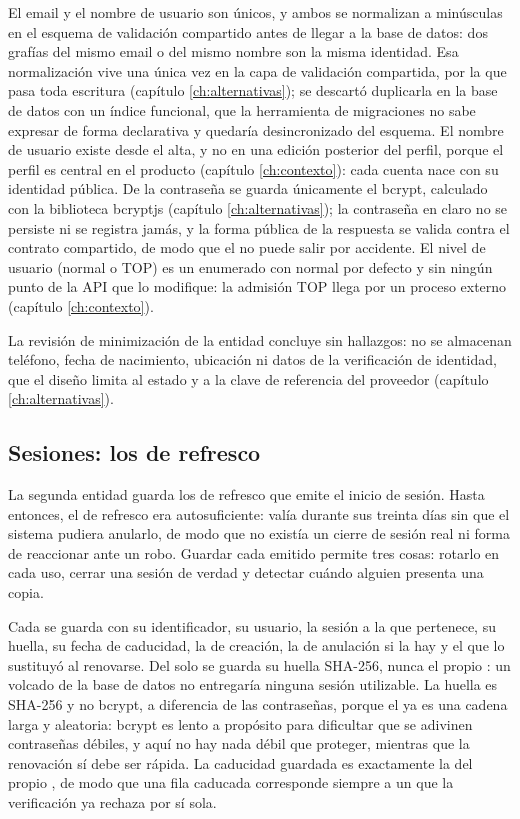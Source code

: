 El email y el nombre de usuario son únicos, y ambos se normalizan a minúsculas en el esquema de validación compartido antes de llegar a la base de datos: dos grafías del mismo email o del mismo nombre son la misma identidad.
Esa normalización vive una única vez en la capa de validación compartida, por la que pasa toda escritura (capítulo \ref{ch:alternativas}); se descartó duplicarla en la base de datos con un índice funcional, que la herramienta de migraciones no sabe expresar de forma declarativa y quedaría desincronizado del esquema.
El nombre de usuario existe desde el alta, y no en una edición posterior del perfil, porque el perfil es central en el producto (capítulo \ref{ch:contexto}): cada cuenta nace con su identidad pública.
De la contraseña se guarda únicamente el  bcrypt, calculado con la biblioteca bcryptjs (capítulo \ref{ch:alternativas}); la contraseña en claro no se persiste ni se registra jamás, y la forma pública de la respuesta se valida contra el contrato compartido, de modo que el  no puede salir por accidente.
El nivel de usuario (normal o TOP) es un enumerado con normal por defecto y sin ningún punto de la \ac{API} que lo modifique: la admisión TOP llega por un proceso externo (capítulo \ref{ch:contexto}).

La revisión de minimización de la entidad concluye sin hallazgos: no se almacenan teléfono, fecha de nacimiento, ubicación ni datos de la verificación de identidad, que el diseño limita al estado y a la clave de referencia del proveedor (capítulo \ref{ch:alternativas}).

\subsection{Sesiones: los  de refresco}
\label{sec:diseno-sesiones}

La segunda entidad guarda los  de refresco que emite el inicio de sesión.
Hasta entonces, el  de refresco era autosuficiente: valía durante sus treinta días sin que el sistema pudiera anularlo, de modo que no existía un cierre de sesión real ni forma de reaccionar ante un robo.
Guardar cada  emitido permite tres cosas: rotarlo en cada uso, cerrar una sesión de verdad y detectar cuándo alguien presenta una copia.

Cada  se guarda con su identificador, su usuario, la sesión a la que pertenece, su huella, su fecha de caducidad, la de creación, la de anulación si la hay y el  que lo sustituyó al renovarse.
Del  solo se guarda su huella SHA-256, nunca el propio : un volcado de la base de datos no entregaría ninguna sesión utilizable.
La huella es SHA-256 y no bcrypt, a diferencia de las contraseñas, porque el  ya es una cadena larga y aleatoria: bcrypt es lento a propósito para dificultar que se adivinen contraseñas débiles, y aquí no hay nada débil que proteger, mientras que la renovación sí debe ser rápida.
La caducidad guardada es exactamente la del propio , de modo que una fila caducada corresponde siempre a un  que la verificación ya rechaza por sí sola.

